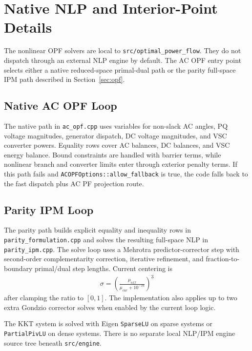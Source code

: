 \section{Native NLP and Interior-Point Details}
\label{sec:engine-nlp-ipm}

The nonlinear OPF solvers are local to \texttt{src/optimal\_power\_flow}.  They
do not dispatch through an external NLP engine by default.  The AC OPF entry
point selects either a native reduced-space primal-dual path or the parity
full-space IPM path described in Section~\ref{sec:opf}.

\subsection{Native AC OPF Loop}

The native path in \texttt{ac\_opf.cpp} uses variables for non-slack AC angles,
PQ voltage magnitudes, generator dispatch, DC voltage magnitudes, and VSC
converter powers.  Equality rows cover AC balances, DC balances, and VSC energy
balance.  Bound constraints are handled with barrier terms, while nonlinear
branch and converter limits enter through exterior penalty terms.  If this path
fails and \texttt{ACOPFOptions::allow\_fallback} is true, the code falls back to
the fast dispatch plus AC PF projection route.

\subsection{Parity IPM Loop}

The parity path builds explicit equality and inequality rows in
\texttt{parity\_formulation.cpp} and solves the resulting full-space NLP in
\texttt{parity\_ipm.cpp}.  The solve loop uses a Mehrotra predictor-corrector
step with second-order complementarity correction, iterative refinement, and
fraction-to-boundary primal/dual step lengths.  Current centering is
\begin{align}
\sigma = \left(\frac{\mu_{aff}}{\mu_{cur}+10^{-16}}\right)^3
\end{align}
after clamping the ratio to \([0,1]\).  The implementation also applies up to
two extra Gondzio corrector solves when enabled by the current loop logic.

The KKT system is solved with Eigen \texttt{SparseLU} on sparse systems or
\texttt{PartialPivLU} on dense systems.  There is no separate local NLP/IPM
engine source tree beneath \texttt{src/engine}.
